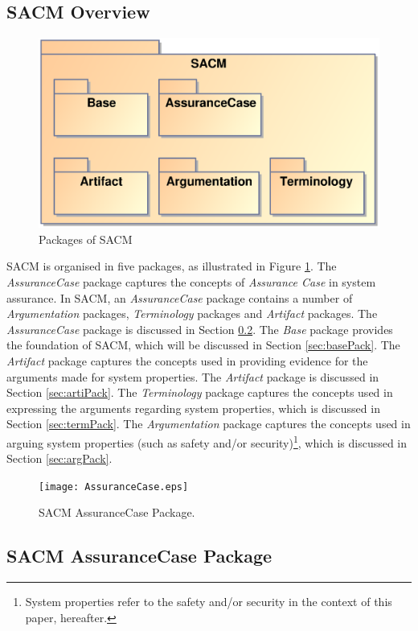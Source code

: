 \subsection{SACM Overview}
\begin{figure}
	\centering
	\includegraphics[width=0.8\linewidth]{Overview.eps}
	\caption{Packages of SACM}
	\label{fig:overview}
\end{figure}
SACM is organised in five packages, as illustrated in Figure \ref{fig:overview}. 
The \textit{AssuranceCase} package captures the concepts of \textit{Assurance Case} in system assurance.
In SACM, an \textit{AssuranceCase} package contains a number of \textit{Argumentation} packages, \textit{Terminology} packages and \textit{Artifact} packages.
The \textit{AssuranceCase} package is discussed in Section \ref{sec:acPack}.
The \textit{Base} package provides the foundation of SACM, which will be discussed in Section \ref{sec:basePack}.
The \textit{Artifact} package captures the concepts used in providing evidence for the arguments made for system properties. 
The \textit{Artifact} package is discussed in Section \ref{sec:artiPack}. 
The \textit{Terminology} package captures the concepts used in expressing the arguments regarding system properties, which is discussed in Section \ref{sec:termPack}. 
The \textit{Argumentation} package captures the concepts used in arguing system properties (such as safety and/or security)\footnote{System properties refer to the safety and/or security in the context of this paper, hereafter.}, which is discussed in Section \ref{sec:argPack}.
 
\begin{figure}
	\centering
	\texttt{[image: AssuranceCase.eps]}
	\caption{SACM AssuranceCase Package.}
	\label{fig:ac}
\end{figure}
\subsection{SACM AssuranceCase Package}
\label{sec:acPack}

